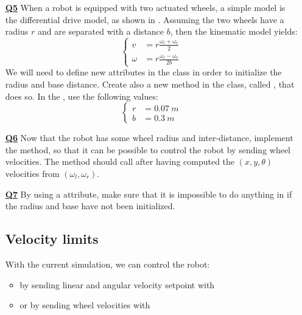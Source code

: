 \documentclass{ecnreport}
\begin{document}
\begin{itemize}
\medskip\item[\textbf{\underline{Q5}}] When a robot is equipped with two actuated wheels, a simple model is the differential drive model, as shown in . Assuming the two wheels have a radius $r$ and are separated with a distance $b$, then the kinematic model yields:
\begin{equation*}\label{eq:dk}
\left\{\begin{array}{ll}
v &= \displaystyle r \frac{\omega_l + \omega_r}{2} \\
\omega &= \displaystyle r \frac{\omega_l - \omega_r}{2b}
\end{array}\right.
\end{equation*}
We will need to define new attributes in the  class in order to initialize the radius and base distance.
Create also a new method in the  class, called , that does so. In the , use the following values:
\begin{equation*}
\left\{\begin{array}{ll}
r &= 0.07 ~m \\
b &= 0.3 ~m
\end{array}\right.
\end{equation*}

\medskip\item[\textbf{\underline{Q6}}] Now that the robot has some wheel radius and inter-distance, implement the  method, so that it can be possible to control the robot by sending wheel velocities.
The method should call  after having computed the $(x,y,\theta)$ velocities from $(\omega_l, \omega_r)$.

\medskip\item[\textbf{\underline{Q7}}] By using a  attribute, make sure that it is impossible to do anything in  if the radius and base have not been initialized.

\subsection{Velocity limits}

With the current simulation, we can control the robot:
\begin{itemize}
\item by sending linear and angular velocity setpoint with 
\item or by sending wheel velocities with 
\end{itemize}


\end{itemize}
\end{document}

